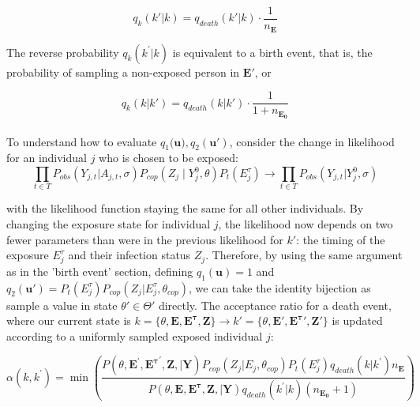\begin{equation}
q_k(k' | k) = q_{death}(k' |k)\cdot \frac{1}{n_{\mathbf{E}}}
\end{equation}

The reverse probability $q_k(k^{\prime} | k)$ is equivalent to a birth event, that is, the probability of sampling a non-exposed person in $\mathbf{E}'$, or 

\begin{equation}
q_k(k | k') = q_{death}(k | k')\cdot \frac{1}{1 + n_{\mathbf{E_0}}}
\end{equation}


\paragraph{}To understand how to evaluate $q_1(\mathbf{u)}, q_2(\mathbf{u}')$, consider the change in likelihood for an individual $j$ who is chosen to be exposed:
\begin{equation}
 \prod_{t \in T}P_{obs}(Y_{j,t}|A_{j,t}, \sigma)P_{cop}(Z_j \mid  Y^0_{j}, \theta)P_t(E_j^\tau) \rightarrow \prod_{t \in T}P_{obs}(Y_{j,t}|Y^0_{j}, \sigma) 
\end{equation}

with the likelihood function staying the same for all other individuals. By changing the exposure state for individual $j$, the likelihood now depends on two fewer parameters than were in the previous likelihood for $k'$: the timing of the exposure $E^\tau_j$ and their infection status $Z_j$. Therefore, by using the same argument as in the 'birth event' section, defining $q_1(\mathbf{u}) = 1$ and $q_2(\mathbf{u}') = P_t(E^\tau_j)P_{cop}(Z_j | E_j^\tau, \theta_{cop})$, we can take the identity bijection as sample a value in state $\theta' \in \Theta'$ directly.  The acceptance ratio for a death event, where our current state is $k = \{\theta, \mathbf{E}, \mathbf{E^\tau}, \mathbf{Z}\} \rightarrow k' = \{\theta, \mathbf{E}', \mathbf{E^\tau}', \mathbf{Z}'\}$ is updated according to a uniformly sampled exposed individual $j$:

\begin{equation}
\label{acc:death}
\alpha(k, k^{\prime}) = \min\left(\frac{P(\theta, \mathbf{E}^{\prime}, \mathbf{E^{\tau}}^{\prime}, \mathbf{Z}, | \mathbf{Y})P_{cop}(Z_{j} | E_{j}, \theta_{cop})P_t(E^\tau_j)q_{death}(k|k^{\prime})n_{\mathbf{E}}}{P(\theta, \mathbf{E}, \mathbf{E^{\tau}}, \mathbf{Z}, | \mathbf{Y})q_{death}(k^{\prime}|k)(n_{\mathbf{E_0}} + 1)} \right)
\end{equation}


